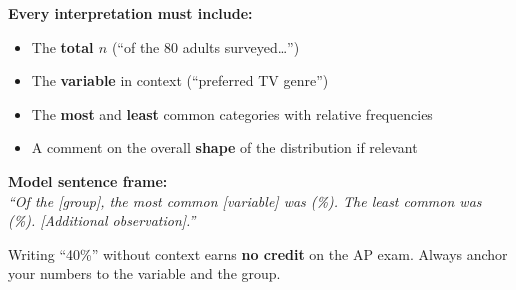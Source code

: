 \documentclass[aspectratio=169, 11pt]{beamer}
\begin{document}
{
\begin{frame}[t, plain]
  \vspace{1em}%
  \hspace{0.55cm}%
  \begin{minipage}{0.9\textwidth}
    \small

    \textbf{\color{navy}Every interpretation must include:}
    \begin{itemize}
      \setlength{\itemsep}{0.4em}
      \item The \textbf{total $n$} (``of the 80 adults surveyed\ldots'')
      \item The \textbf{variable} in context (``preferred TV genre'')
      \item The \textbf{most} and \textbf{least} common categories with relative frequencies
      \item A comment on the overall \textbf{shape} of the distribution if relevant
    \end{itemize}

    \vspace{0.5cm}
    {\color{navy}\bfseries\small Model sentence frame:}\\[6pt]
    \small\textit{``Of the \underline{\hspace{1cm}} [group], the most common
    [variable] was \underline{\hspace{1.8cm}} (\underline{\hspace{1cm}}\%).
    The least common was \underline{\hspace{1.8cm}} (\underline{\hspace{1cm}}\%).
    [Additional observation].''}

    \vspace{0.4cm}
    {\color{slate}\footnotesize
      Writing ``40\%'' without context earns \textbf{no credit} on the AP exam.
      Always anchor your numbers to the variable and the group.}
  \end{minipage}
\end{frame}
}
\end{document}
